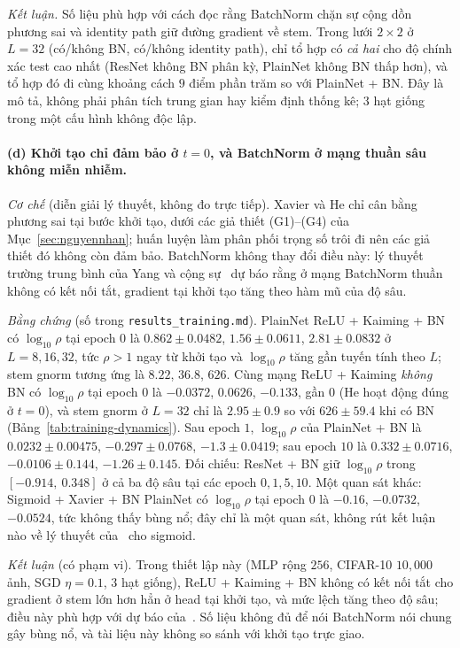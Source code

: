 \emph{Kết luận.} Số liệu phù hợp với cách đọc rằng BatchNorm chặn sự cộng dồn phương sai và identity
path giữ đường gradient về stem. Trong lưới $2\times2$ ở $L=32$ (có/không BN, có/không identity path),
chỉ tổ hợp có \emph{cả hai} cho độ chính xác test cao nhất (ResNet không BN phân kỳ, PlainNet không BN thấp
hơn), và tổ hợp đó đi cùng khoảng cách $9$ điểm phần trăm so với PlainNet + BN. Đây là mô tả, không phải phân tích trung gian hay kiểm
định thống kê; $3$ hạt giống trong một cấu hình không độc lập.

\paragraph{(d) Khởi tạo chỉ đảm bảo ở $t=0$, và BatchNorm ở mạng thuần sâu không miễn nhiễm.}
\label{par:khoitao-bn}
\emph{Cơ chế} (diễn giải lý thuyết, không đo trực tiếp). Xavier và He chỉ cân bằng
phương sai tại bước khởi tạo, dưới các giả thiết (G1)--(G4) của Mục~\ref{sec:nguyennhan};
huấn luyện làm phân phối trọng số trôi đi nên các giả thiết đó không còn đảm bảo.
BatchNorm không thay đổi điều này: lý thuyết trường trung bình của
Yang và cộng sự~\cite{Yang2019MeanField} dự báo rằng ở mạng BatchNorm thuần không có kết nối tắt,
gradient tại khởi tạo tăng theo hàm mũ của độ sâu.

\emph{Bằng chứng} (số trong \texttt{results\_training.md}). PlainNet ReLU + Kaiming + BN
có $\log_{10}\rho$ tại epoch $0$ là $0.862\pm0.0482$, $1.56\pm0.0611$, $2.81\pm0.0832$ ở
$L=8,16,32$, tức $\rho>1$ ngay từ khởi tạo và $\log_{10}\rho$ tăng gần tuyến tính theo $L$;
stem gnorm tương ứng là $8.22$, $36.8$, $626$. Cùng mạng ReLU + Kaiming \emph{không} BN
có $\log_{10}\rho$ tại epoch $0$ là $-0.0372$, $0.0626$, $-0.133$, gần $0$ (He hoạt động
đúng ở $t=0$), và stem gnorm ở $L=32$ chỉ là $2.95\pm0.9$ so với $626\pm59.4$ khi có BN
(Bảng~\ref{tab:training-dynamics}). Sau epoch $1$, $\log_{10}\rho$ của PlainNet + BN
là $0.0232\pm0.00475$, $-0.297\pm0.0768$, $-1.3\pm0.0419$; sau epoch $10$ là
$0.332\pm0.0716$, $-0.0106\pm0.144$, $-1.26\pm0.145$. Đối chiếu: ResNet + BN giữ
$\log_{10}\rho$ trong $[-0.914,\ 0.348]$ ở cả ba độ sâu tại các epoch $0,1,5,10$.
Một quan sát khác: Sigmoid + Xavier + BN PlainNet có $\log_{10}\rho$ tại epoch $0$ là
$-0.16$, $-0.0732$, $-0.0524$, tức không thấy bùng nổ; đây chỉ là một quan sát, không rút
kết luận nào về lý thuyết của~\cite{Yang2019MeanField} cho sigmoid.

\emph{Kết luận} (có phạm vi). Trong thiết lập này (MLP rộng $256$, CIFAR-10 $10{,}000$ ảnh,
SGD $\eta=0.1$, $3$ hạt giống), ReLU + Kaiming + BN không có kết nối tắt cho gradient ở
stem lớn hơn hẳn ở head tại khởi tạo, và mức lệch tăng theo độ sâu; điều này phù hợp với dự báo
của~\cite{Yang2019MeanField}. Số liệu không đủ để nói BatchNorm nói chung gây bùng nổ, và
tài liệu này không so sánh với khởi tạo trực giao.

